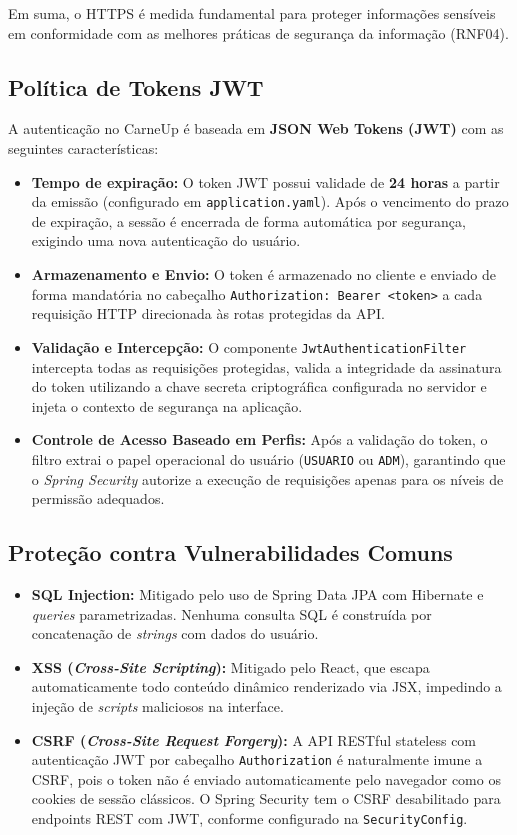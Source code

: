 \documentclass[
	12pt,				%
	openany,			%
	oneside,			%
	a4paper,			%
	english,			%
	french,				%
	spanish,			%
	brazil				%
	]{abntex2}
\begin{document}
Em suma, o HTTPS é medida fundamental para proteger informações sensíveis em conformidade com as melhores práticas de segurança da informação (RNF04).

\subsection{Política de Tokens JWT}

A autenticação no CarneUp é baseada em \textbf{JSON Web Tokens (JWT)} com as seguintes características:

\begin{itemize}
    \item \textbf{Tempo de expiração:} O token JWT possui validade de \textbf{24 horas} a partir da emissão (configurado em \texttt{application.yaml}). Após o vencimento do prazo de expiração, a sessão é encerrada de forma automática por segurança, exigindo uma nova autenticação do usuário.
    \item \textbf{Armazenamento e Envio:} O token é armazenado no cliente e enviado de forma mandatória no cabeçalho \texttt{Authorization: Bearer <token>} a cada requisição HTTP direcionada às rotas protegidas da API.
    \item \textbf{Validação e Intercepção:} O componente \texttt{JwtAuthenticationFilter} intercepta todas as requisições protegidas, valida a integridade da assinatura do token utilizando a chave secreta criptográfica configurada no servidor e injeta o contexto de segurança na aplicação.
    \item \textbf{Controle de Acesso Baseado em Perfis:} Após a validação do token, o filtro extrai o papel operacional do usuário (\texttt{USUARIO} ou \texttt{ADM}), garantindo que o \textit{Spring Security} autorize a execução de requisições apenas para os níveis de permissão adequados.
\end{itemize}

\subsection{Proteção contra Vulnerabilidades Comuns}

\begin{itemize}
    \item \textbf{SQL Injection:} Mitigado pelo uso de Spring Data JPA com Hibernate e \textit{queries} parametrizadas. Nenhuma consulta SQL é construída por concatenação de \textit{strings} com dados do usuário.
    \item \textbf{XSS (\textit{Cross-Site Scripting}):} Mitigado pelo React, que escapa automaticamente todo conteúdo dinâmico renderizado via JSX, impedindo a injeção de \textit{scripts} maliciosos na interface.
    \item \textbf{CSRF (\textit{Cross-Site Request Forgery}):} A API RESTful stateless com autenticação JWT por cabeçalho \texttt{Authorization} é naturalmente imune a CSRF, pois o token não é enviado automaticamente pelo navegador como os cookies de sessão clássicos. O Spring Security tem o CSRF desabilitado para endpoints REST com JWT, conforme configurado na \texttt{SecurityConfig}.
\end{itemize}
\end{document}
